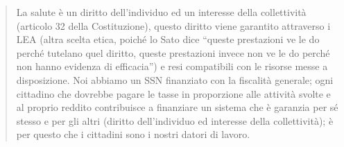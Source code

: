 \documentclass[]{article}
\begin{document}
\begin{quote}
La salute è un diritto dell'individuo ed un interesse della collettività
(articolo 32 della Costituzione), questo diritto viene garantito
attraverso i LEA (altra scelta etica, poiché lo Sato dice ``queste
prestazioni ve le do perché tutelano quel diritto, queste prestazioni
invece non ve le do perché non hanno evidenza di efficacia'') e resi
compatibili con le risorse messe a disposizione. Noi abbiamo un SSN
finanziato con la fiscalità generale; ogni cittadino che dovrebbe pagare
le tasse in proporzione alle attività svolte e al proprio reddito
contribuisce a finanziare un sistema che è garanzia per sé stesso e per
gli altri (diritto dell'individuo ed interesse della collettività); è
per questo che i cittadini sono i nostri datori di lavoro.
\end{quote}
\end{document}
